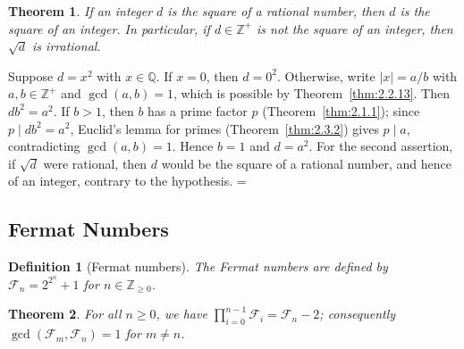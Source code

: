\documentclass[11pt]{article}
\makeatletter
\let\nt@closedisplay\]
\def\nt@guardedclose{\@ifnextchar\par{\nt@closeafterpar}{\@ifnextchar\end{\postdisplaypenalty\@M\nt@closedisplay}{\nt@closedisplay}}}
\def\nt@closeafterpar\par{\@ifnextchar\par{\nt@closeafterpar}{\@ifnextchar\end{\postdisplaypenalty\@M\nt@closedisplay\par}{\nt@closedisplay\par}}}
\renewenvironment{proof}[1][\proofname]{\par
  \pushQED{\qed}\normalfont\topsep\medskipamount\edef\nt@afterproof{\@endparpenalty=\the\@endparpenalty\relax}\@beginparpenalty\@M\@endparpenalty\@M\let\]\nt@guardedclose\trivlist\item[]\textit{#1\@addpunct{.}} \ignorespaces}{\ifvmode\addpenalty\@M\fi\popQED\nt@afterproof\endtrivlist\@endpefalse}
\theoremstyle{ntstyle}
\newtheorem{theorem}{Theorem}[subsection]
\newtheorem{definition}{Definition}[subsection]
\makeatother
\begin{document}
\begin{theorem}\label{thm:2.3.7} If an integer $d$ is the square of a rational
  number, then $d$ is the square of an integer. In particular, if
  $d\in\mathbb{Z}^+$ is not the square of an integer, then $\sqrt{d}$ is
  irrational.

\end{theorem}

\begin{proof} Suppose $d=x^2$ with $x\in\mathbb{Q}$. If $x=0$, then
  $d=0^2$. Otherwise, write $|x|=a/b$ with $a,b\in\mathbb{Z}^+$ and
  $\gcd(a,b)=1$, which is possible by Theorem~\ref{thm:2.2.13}. Then
  $db^2=a^2$. If $b>1$, then $b$ has a prime factor $p$
  (Theorem~\ref{thm:2.1.1}); since $p\mid db^2=a^2$, Euclid's lemma for primes
  (Theorem~\ref{thm:2.3.2}) gives $p\mid a$, contradicting $\gcd(a,b)=1$.
  Hence $b=1$ and $d=a^2$. For the second assertion, if $\sqrt{d}$ were
  rational, then $d$ would be the square of a rational number, and hence of
  an integer, contrary to the hypothesis.
\end{proof}
\subsection{Fermat Numbers}
\begin{definition}[Fermat numbers]\label{def:2.4.1}\label{def:fermat-numbers}
  The Fermat numbers are defined by $\mathcal{F}_n = 2^{2^{n}} + 1$ for $n\in\mathbb{Z}_{\ge0}$.

\end{definition}

\begin{theorem}\label{thm:2.4.1}\label{thm:fermat-product-and-coprimality}
  For all $n\ge0$, we have $\prod_{i=0}^{n-1}\mathcal{F}_i=\mathcal{F}_n-2$;
  consequently $\gcd(\mathcal{F}_m, \mathcal{F}_n)=1$ for $m\neq n$.

\end{theorem}
\end{document}

